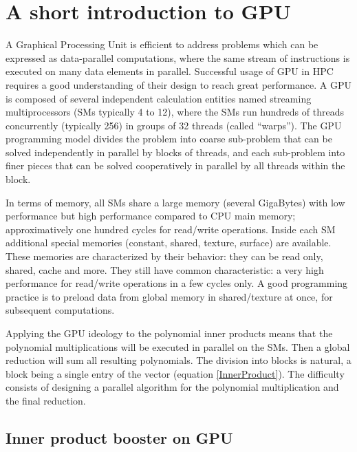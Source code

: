 \documentclass[oribibl]{llncs2e/llncs}
\begin{document}
\section{A short introduction to GPU}

A Graphical Processing Unit  is efficient  to address problems which can be expressed as data-parallel computations, where the same stream of instructions
is executed on many data elements in parallel. Successful usage of GPU in HPC requires a good understanding of their design to reach great performance. A GPU is composed 
of several independent calculation  entities named streaming multiprocessors (SMs typically 4 to 12), where the SMs run hundreds of threads concurrently (typically 256) in groups of 32 threads (called ``warps'').
The GPU programming model divides the problem into coarse sub-problem that can be solved independently in parallel by blocks of threads,
 and each sub-problem into finer pieces that can be solved cooperatively in parallel by all threads within the block.

In terms of memory, all SMs  share  a large  memory (several GigaBytes) with  low performance but  high performance compared to CPU main memory; approximatively one hundred cycles for read/write operations. Inside each SM additional special memories (constant, shared, texture, surface) are available. These memories are characterized by their behavior: they can be read only, shared, cache and more.   They still have common characteristic: a very high performance for read/write  operations in a few cycles only.
A good programming practice is to preload data from global memory in shared/texture at once, for subsequent computations.  \label{CUDA_PRACTICE}

Applying the GPU ideology to the polynomial inner products  means that the polynomial multiplications will be executed in parallel on the SMs. Then a global reduction will sum all resulting polynomials. The division into blocks is natural, a block being a single entry of the vector (equation \ref{InnerProduct}).  The difficulty consists of designing a parallel algorithm for the polynomial multiplication and the final reduction.

\subsection{Inner product booster on GPU}
\end{document}
